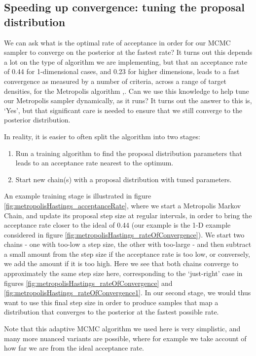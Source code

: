 \documentclass[11pt,fullpage]{book}
\begin{document}
\subsection{Speeding up convergence: tuning the proposal distribution}\label{sec:metropolisHastings_tuneAcceptRejectRule}
We can ask what is the optimal rate of acceptance in order for our MCMC sampler to converge on the posterior at the fastest rate? It turns out this depends a lot on the type of algorithm we are implementing, but that an acceptance rate of 0.44 for 1-dimensional cases, and 0.23 for higher dimensions, leads to a fast convergence as measured by a number of criteria, across a range of target densities, for the Metropolis algorithm \cite{roberts1997weak},\cite{rosenthal2011optimal}. Can we use this knowledge to help tune our Metropolis sampler dynamically, as it runs? It turns out the answer to this is, `Yes', but that significant care is needed to ensure that we still converge to the posterior distribution. 

In reality, it is easier to often split the algorithm into two stages:
%
\begin{enumerate}
\item Run a training algorithm to find the proposal distribution parameters that leads to an acceptance rate nearest to the optimum. 
\item Start new chain(s) with a proposal distribution with tuned parameters.
\end{enumerate}
%
An example training stage is illustrated in figure \ref{fig:metropolisHastings_acceptanceRate}, where we start a Metropolis Markov Chain, and update its proposal step size at regular intervals, in order to bring the acceptance rate closer to the ideal of 0.44 (our example is the 1-D example considered in figure \ref{fig:metropolisHastings_rateOfConvergence}). We start two chains - one with too-low a step size, the other with too-large - and then subtract a small amount from the step size if the acceptance rate is too low, or conversely, we add the amount if it is too high. Here we see that both chains converge to approximately the same step size here, corresponding to the `just-right' case in figures \ref{fig:metropolisHastings_rateOfConvergence} and \ref{fig:metropolisHastings_rateOfConvergence1}. In our second stage, we would thus want to use this final step size in order to produce samples that map a distribution that converges to the posterior at the fastest possible rate.

Note that this adaptive MCMC algorithm we used here is very simplistic, and many more nuanced variants are possible, where for example we take account of how far we are from the ideal acceptance rate. 
\end{document}
